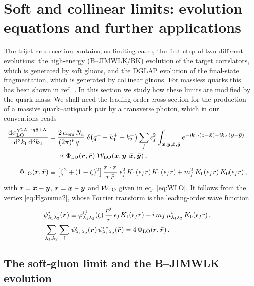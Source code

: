 \section{Soft and collinear limits: evolution equations and further applications}
\label{sec:limits}

The trijet cross-section contains, as limiting cases, the first step of two different evolutions: the
high-energy (B--JIMWLK/BK) evolution of the target correlators, which is generated by soft gluons, and
the DGLAP evolution of the final-state fragmentation, which is generated by collinear gluons. For
massless quarks this has been shown in ref.~\cite{Iancu:2022gpw}. In this section we study how these
limits are modified by the quark mass. We shall need the leading-order cross-section for the
production of a massive quark--antiquark pair by a transverse photon, which in our conventions reads
\begin{align}
\frac{{\rm d}\sigma^{\gamma^{*}_{T} A\to q\bar q+X}_{\rm LO}}{{\rm d}^3k_1\,{\rm d}^3k_2}={}&\frac{2\,\alpha_{\rm em}\,N_c}{(2\pi)^6\,q^+}\;
\delta\big(q^+-k_1^+-k_2^+\big)\sum_fe_f^2\int_{\bm{x},\bm{y},\bar{\bm{x}},\bar{\bm{y}}}e^{-i\bm{k}_1\cdot(\bm{x}-\bar{\bm{x}})-i\bm{k}_2\cdot(\bm{y}-\bar{\bm{y}})}
\nonumber\\
&\times\Phi_{\rm LO}(\bm{r},\bar{\bm r})\;\mathcal{W}_{\rm LO}(\bm{x},\bm{y};\bar{\bm{x}},\bar{\bm{y}})\,,
\label{eq:LO}\\[1mm]
\Phi_{\rm LO}(\bm{r},\bar{\bm r})\equiv{}&\big[\zeta^2+(1-\zeta)^2\big]\,\frac{\bm{r}\cdot\bar{\bm r}}{r\,\bar r}\;
\epsilon_f^2\,K_1(\epsilon_f r)\,K_1(\epsilon_f\bar r)+m_f^2\,K_0(\epsilon_f r)\,K_0(\epsilon_f\bar r)\,,
\label{eq:PhiLO}
\end{align}
with $\bm r=\bm{x}-\bm{y}$, $\bar{\bm r}=\bar{\bm{x}}-\bar{\bm{y}}$ and $\mathcal{W}_{\rm LO}$ given in eq.~\eqref{eq:WLO}. It follows from
the vertex \eqref{eq:Hgamma2}, whose Fourier transform is the leading-order wave function
\begin{align}
\psi^i_{\lambda_1\lambda_2}(\bm r)&\equiv\varphi^{ij}_{\lambda_1\lambda_2}(\zeta)\,\frac{r^j}{r}\,\epsilon_f K_1(\epsilon_f r)
-i\,m_f\,\mu^i_{\lambda_1\lambda_2}\,K_0(\epsilon_f r)\,,
\nonumber\\
\sum_{\lambda_1,\lambda_2}\sum_i&\;\psi^i_{\lambda_1\lambda_2}(\bm r)\,\psi^{i\,*}_{\lambda_1\lambda_2}(\bar{\bm r})
=4\,\Phi_{\rm LO}(\bm r,\bar{\bm r})\,.
\label{eq:psiLO}
\end{align}

\subsection{The soft-gluon limit and the B--JIMWLK evolution}
\label{sec:soft}

